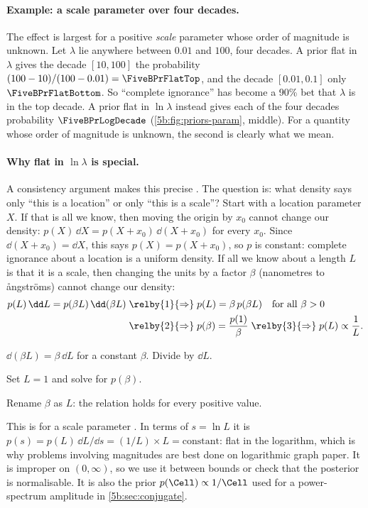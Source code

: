 \paragraph{Example: a scale parameter over four decades.}
The effect is largest for a positive \emph{scale} parameter  whose order of magnitude is unknown.
Let $\lambda$ lie anywhere between $0.01$ and $100$, four decades. A prior flat in
$\lambda$ gives the decade $[10,100]$ the probability $(100-10)/(100-0.01)=
\FiveBPrFlatTop$, and the decade $[0.01,0.1]$ only $\FiveBPrFlatBottom$. So ``complete
ignorance'' has become a 90\% bet that $\lambda$ is in the top decade. A prior flat in $\ln\lambda$ instead gives each of the
four decades probability $\FiveBPrLogDecade$ (\cref{5b:fig:priors-param}, middle). For a
quantity whose order of magnitude is unknown, the second is clearly what we mean.

\paragraph{Why flat in $\ln\lambda$ is special.} A consistency argument makes this
precise . The question is: what density says only ``this is a
location'' or only ``this is a scale''? Start with a location parameter $X$. If that is
all we know, then moving the origin by $x_0$ cannot change our density:
$p(X)\,\dd X=p(X+x_0)\,\dd(X+x_0)$ for every $x_0$. Since $\dd(X+x_0)=\dd X$, this says
$p(X)=p(X+x_0)$, so $p$ is constant: complete ignorance about a location is a uniform
density. If all we know about a length $L$ is that it is a scale, then changing the
units by a factor $\beta$ (nanometres to \aa ngstr\"oms) cannot change our density:
\begin{align*}
  p(L)\,\dd L=p(\beta L)\,\dd(\beta L)
  \;&\relby{1}{\Rightarrow}\; p(L)=\beta\,p(\beta L)\quad\text{for all }\beta>0\\
  &\relby{2}{\Rightarrow}\; p(\beta)=\frac{p(1)}{\beta}
  \;\relby{3}{\Rightarrow}\; p(L)\propto\frac1L .
\end{align*}
\begin{explain}
  \item $\dd(\beta L)=\beta\,\dd L$ for a constant $\beta$. Divide by $\dd L$.
  \item Set $L=1$ and solve for $p(\beta)$.
  \item Rename $\beta$ as $L$: the relation holds for every positive value.
\end{explain}
This is  for a scale parameter .
In terms of $s=\ln L$ it is $p(s)=p(L)\,\dd L/\dd s=(1/L)\times L=\text{constant}$: flat
in the logarithm, which is why problems involving magnitudes are best done on
logarithmic graph paper. It is improper on $(0,\infty)$, so we use it between bounds
or check that the posterior is normalisable. It is also the prior
$p(\Cell)\propto1/\Cell$ used for a power-spectrum amplitude in \cref{5b:sec:conjugate}.

